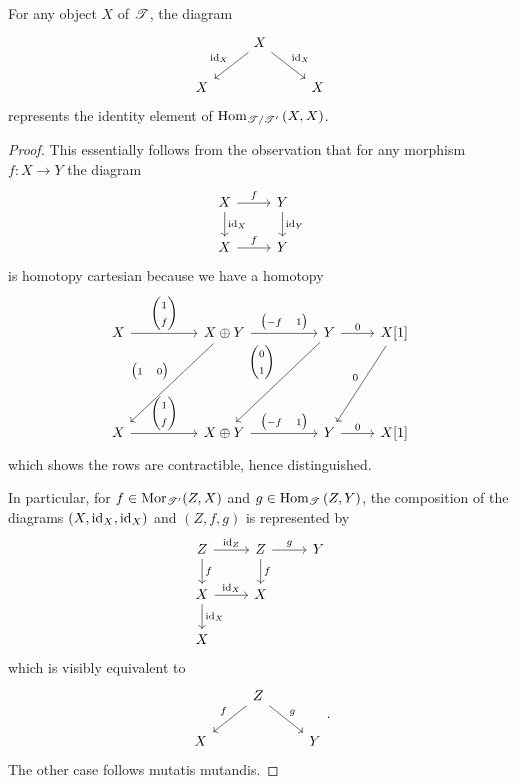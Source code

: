 \documentclass[dissertation.tex]{subfiles}
\begin{document}
\begin{lem}
  For any object $X$ of $\mathscr{T}$, the diagram 
  $$\begin{tikzcd}
    & X\arrow[swap]{ld}{\id_X}\arrow{rd}{\id_X}\\
    X & & X
  \end{tikzcd}$$
  represents the identity element of $\operatorname{Hom}_{\mathscr{T}/\mathscr{T}^\prime}\left(X,X\right)$.
  \begin{proof}
    This essentially follows from the observation that for any morphism $f : X \to Y$ the diagram
    $$\begin{tikzcd}
      X \arrow{r}{f}\arrow{d}{\id_X} & Y\arrow{d}{\id_Y}\\
      X \arrow{r}{f} & Y
    \end{tikzcd}$$
    is homotopy cartesian because we have a homotopy 
    $$\begin{tikzcd}[ampersand replacement=\&]
      X \arrow{rr}{\left(\begin{matrix}1\\f\end{matrix}\right)} \&\& X \oplus Y \arrow{rr}{\left(\begin{matrix}-f & 1\end{matrix}\right)}\arrow[swap]{llddd}{\left(\begin{matrix}1 & 0\end{matrix}\right)} \&\& Y \arrow{r}{0}\arrow[swap]{llddd}{\left(\begin{matrix}0\\1\end{matrix}\right)} \& X[1]\arrow[swap]{lddd}{0}\\
      \\
      \\
      X \arrow{rr}{\left(\begin{matrix}1\\f\end{matrix}\right)} \&\& X \oplus Y \arrow{rr}{\left(\begin{matrix}-f & 1\end{matrix}\right)} \&\& Y \arrow{r}{0} \& X[1]
    \end{tikzcd}$$
    which shows the rows are contractible, hence distinguished.
    
    In particular, for $f \in \operatorname{Mor}_{\mathscr{T}^\prime}(Z,X)$ and $g \in \operatorname{Hom}_{\mathscr{T}}\left(Z,Y\right)$, the composition of the diagrams $(X,\operatorname{id}_X, \operatorname{id}_X)$ and $(Z,f,g)$ is represented by
    $$\begin{tikzcd}
      Z \arrow{r}{\id_Z}\arrow{d}{f} & Z\arrow{d}{f}\arrow{r}{g} & Y\\
      X \arrow{r}{\id_X}\arrow{d}{\id_X} & X\\
      X
    \end{tikzcd}$$
    which is visibly equivalent to 
    $$\begin{tikzcd}
      & Z\arrow[swap]{ld}{f}\arrow{rd}{g}\\
      X & & Y
    \end{tikzcd}.$$
    The other case follows mutatis mutandis.
  \end{proof}
\end{lem}
\end{document}
